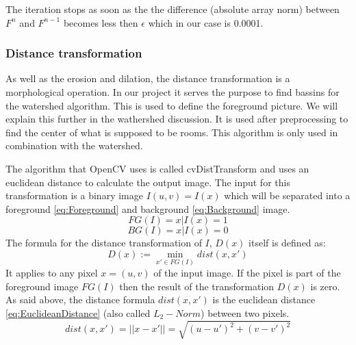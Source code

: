 The iteration stops as soon as the the difference (absolute array norm) between $F^{n}$ and $F^{n-1}$ becomes less then $\epsilon$ which in our case is 0.0001.

\subsubsection{Distance transformation}
\label{subsubsec:Distance transformation}
As well as the erosion and dilation, the distance transformation is a morphological operation. In our project it serves the purpose to find bassins for the watershed algorithm. This is used to define the foreground picture. We will explain this further in the wathershed discussion.
It is used after preprocessing to find the center of what is supposed to be rooms. This algorithm is only used in combination with the watershed.

The algorithm that OpenCV uses is called cvDistTransform and uses an euclidean distance to calculate the output image. The input for this transformation is a binary image $I(u,v) = I(x)$ which will be separated into a foreground \eqref{eq:Foreground} and background \eqref{eq:Background} image.
\begin{equation}\label{eq:Foreground}FG(I) = {x | I(x) = 1}\end{equation}
\begin{equation}\label{eq:Background}BG(I) = {x | I(x) = 0}\end{equation}
The formula for the distance transformation of $I$, $D(x)$ itself is defined as:
\[D(x) :=\min_{x' \in FG(I)} dist(x,x') \]
It applies to any pixel $x = (u,v)$ of the input image. If the pixel is part of the foreground image $FG(I)$ then the result of the transformation $D(x)$ is zero. As said above, the distance formula $dist(x,x')$ is the euclidean distance \eqref{eq:EuclideanDistance} (also called $L_{2}-Norm$) between two pixels.
\begin{equation}\label{eq:EuclideanDistance}dist(x,x') = ||x - x'|| = \sqrt{(u - u')^2 + (v - v')^2}\end{equation}

